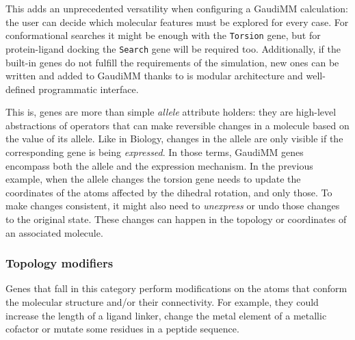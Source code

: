 This adds an unprecedented versatility when configuring a GaudiMM calculation: the user can decide which molecular features must be explored for every case. For conformational searches it might be enough with the \texttt{Torsion} gene, but for protein-ligand docking the \texttt{Search} gene will be required too. Additionally, if the built-in genes do not fulfill the requirements of the simulation, new ones can be written and added to GaudiMM thanks to is modular architecture and well-defined programmatic interface.

This is, genes are more than simple \textit{allele} attribute holders: they are high-level abstractions of operators that can make reversible changes in a molecule based on the value of its allele. Like in Biology, changes in the allele are only visible if the corresponding gene is being \textit{expressed}. In those terms, GaudiMM genes encompass both the allele and the expression mechanism. In the previous example, when the allele changes the torsion gene needs to update the coordinates of the atoms affected by the dihedral rotation, and only those. To make changes consistent, it might also need to \textit{unexpress} or undo those changes to the original state. These changes can happen in the topology or coordinates of an associated molecule.

\subsubsection{Topology modifiers}
Genes that fall in this category perform modifications on the atoms that conform the molecular structure and/or their connectivity. For example, they could increase the length of a ligand linker, change the metal element of a metallic cofactor or mutate some residues in a peptide sequence.

